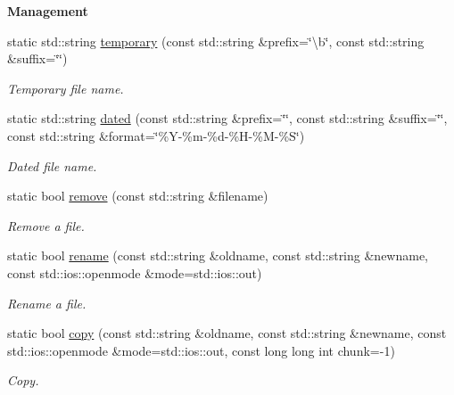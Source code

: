 \begin{Indent}{\bf Management}\par
\begin{DoxyCompactItemize}
\item 
static std\-::string \hyperlink{exceptionmagrathea_1_1FileSystem_ac8d575fbc1fbb3c49b96cfc80a3f19fa}{temporary} (const std\-::string \&prefix=\char`\"{}\textbackslash{}b\char`\"{}, const std\-::string \&suffix=\char`\"{}\char`\"{})
\begin{DoxyCompactList}\small\item\em Temporary file name. \end{DoxyCompactList}\item 
static std\-::string \hyperlink{exceptionmagrathea_1_1FileSystem_af89c2d6a918b7d7c0c17ca5b59f98bce}{dated} (const std\-::string \&prefix=\char`\"{}\char`\"{}, const std\-::string \&suffix=\char`\"{}\char`\"{}, const std\-::string \&format=\char`\"{}\%Y-\/\%m-\/\%d-\/\%H-\/\%M-\/\%S\char`\"{})
\begin{DoxyCompactList}\small\item\em Dated file name. \end{DoxyCompactList}\item 
static bool \hyperlink{exceptionmagrathea_1_1FileSystem_adb8dbf24aaa89c7a0509b675b5d71812}{remove} (const std\-::string \&filename)
\begin{DoxyCompactList}\small\item\em Remove a file. \end{DoxyCompactList}\item 
static bool \hyperlink{exceptionmagrathea_1_1FileSystem_a3b9d515761f4e5041c3eac9307d4d570}{rename} (const std\-::string \&oldname, const std\-::string \&newname, const std\-::ios\-::openmode \&mode=std\-::ios\-::out)
\begin{DoxyCompactList}\small\item\em Rename a file. \end{DoxyCompactList}\item 
static bool \hyperlink{exceptionmagrathea_1_1FileSystem_a5fb019d214bae39f7d75770908c9d025}{copy} (const std\-::string \&oldname, const std\-::string \&newname, const std\-::ios\-::openmode \&mode=std\-::ios\-::out, const long long int chunk=-\/1)
\begin{DoxyCompactList}\small\item\em Copy. \end{DoxyCompactList}\end{DoxyCompactItemize}
\end{Indent}
